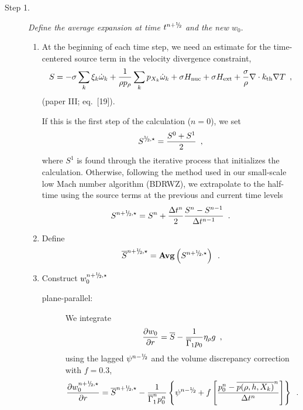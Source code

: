 \begin{description}

\item[Step 1.] {\em Define the average expansion at time $t^\nph$ and the new $w_0.$}

\begin{enumerate}
\renewcommand{\theenumi}{{\bf \alph{enumi}}}

\item At the beginning of each time step, we need an estimate for the time-centered
source term in the velocity divergence constraint,
\begin{equation}
  S =  -\sigma  \sum_k  \xi_k \dot{\omega}_k  + 
  \frac{1}{\rho p_\rho} \sum_k p_{X_k}  {\dot{\omega}}_k  + \sigma {H_{\rm nuc}} + \sigma {H_{\rm ext}} 
  + \frac{\sigma}{\rho}\nabla\cdot k_{\rm th}\nabla T \enskip ,
\label{eq:defineS} 
\end{equation}
(paper III; eq.~[19]).

If this is the first step of the calculation ($n=0$), we set
\begin{equation}
S^{\myhalf,\star} = \frac{S^0 + S^1}{2} \enskip ,
\end{equation}
where $S^1$ is found through the iterative process that initializes the calculation.
Otherwise, following the method used in our small-scale low Mach number algorithm
(BDRWZ), we extrapolate to the half-time using the source
terms at the previous and current time levels
\begin{equation}
S^{\nph,\star} = S^n + \frac{\Delta t^n}{2} \frac{S^n - S^{n-1}}{\Delta t^{n-1}} \enskip .
\end{equation}

\item Define
\begin{equation}
\overline{S}^{\nph,\star} = {\mathrm{\bf Avg}} \left(S^{\nph,\star}\right) \enskip .
\end{equation}

\item Construct $w_0^{\nph,\star}$

\begin{description}

\item[plane-parallel:] We integrate
\begin{equation}
\frac{\partial w_0}{\partial r} =  \overline{S} - \frac{1}{\overline{\Gamma}_1 p_0} \eta_{\rho} g 
\enskip \label{eq:divw0} ,
\end{equation}
using the lagged $\psi^{\nmh}$ and the volume discrepancy correction with $f=0.3$,
\begin{equation}
\frac{\partial w_0^{\nph,\star}}{\partial r} =  \overline{S}^{\nph,\star} 
- \frac{1}{\gammabar^{n} p_0^{n}}
\left\{ \psi^{\nmh} + 
f \left[\frac{p_0^n - \overline{p(\rho,h,X_k)}^n}{\Delta t^n} \right]\right\}
\enskip .
\end{equation}


\end{description}
\end{enumerate}
\end{description}
